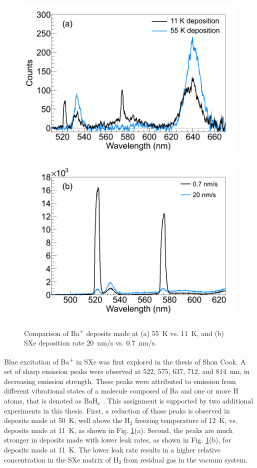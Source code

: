 
\begin{figure} %
        \centering
                \includegraphics[width=.5\textwidth]{figures/BaHx_a.png}
                ~
                \includegraphics[width=.5\textwidth]{figures/BaHx_b.png}
                \caption{Comparison of Ba\textsuperscript{+} deposits made at (a) 55~K vs. 11~K, and (b) SXe deposition rate 20~nm/s vs. 0.7~nm/s.\cite{Mong2015}}
\label{fig:BaHx}
\end{figure}


Blue excitation of Ba\textsuperscript{+} in SXe was first explored in the thesis of Shon Cook.  A set of sharp emission peaks were observed at 522, 575, 637, 712, and 814~nm, in decreasing emission strength.  These peaks were attributed to emission from different vibrational states of a molecule composed of Ba and one or more H atoms, that is denoted as BaH$_{x}$ \cite{Shon}.  This assignment is supported by two additional experiments in this thesis.  First, a reduction of those peaks is observed in deposits made at 50~K, well above the H$_{2}$ freezing temperature of 12~K, vs. deposits made at 11~K, as shown in Fig. \ref{fig:BaHx}(a).  Second, the peaks are much stronger in deposits made with lower leak rates, as shown in Fig. \ref{fig:BaHx}(b), for deposits made at 11~K.  The lower leak rate results in a higher relative concentration in the SXe matrix of H$_2$ from residual gas in the vacuum system.

